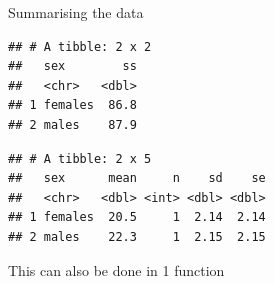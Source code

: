 \documentclass[
]{article}
\newenvironment{Shaded}{\begin{snugshade}}{\end{snugshade}}
\newcommand{\ControlFlowTok}[1]{\textcolor[rgb]{0.13,0.29,0.53}{\textbf{#1}}}
\newcommand{\DataTypeTok}[1]{\textcolor[rgb]{0.13,0.29,0.53}{#1}}
\newcommand{\DecValTok}[1]{\textcolor[rgb]{0.00,0.00,0.81}{#1}}
\newcommand{\KeywordTok}[1]{\textcolor[rgb]{0.13,0.29,0.53}{\textbf{#1}}}
\newcommand{\NormalTok}[1]{#1}
\newcommand{\OperatorTok}[1]{\textcolor[rgb]{0.81,0.36,0.00}{\textbf{#1}}}
\newcommand{\StringTok}[1]{\textcolor[rgb]{0.31,0.60,0.02}{#1}}
\begin{document}
Summarising the data

\begin{Shaded}
\end{Shaded}

\begin{verbatim}
## # A tibble: 2 x 2
##   sex        ss
##   <chr>   <dbl>
## 1 females  86.8
## 2 males    87.9
\end{verbatim}

\begin{Shaded}
\end{Shaded}

\begin{verbatim}
## # A tibble: 2 x 5
##   sex      mean     n    sd    se
##   <chr>   <dbl> <int> <dbl> <dbl>
## 1 females  20.5     1  2.14  2.14
## 2 males    22.3     1  2.15  2.15
\end{verbatim}

This can also be done in 1 function
\end{document}
